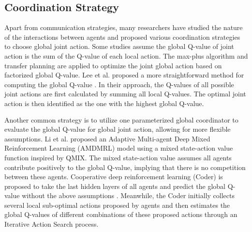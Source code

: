 \subsection{Coordination Strategy}
Apart from communication strategies, many researchers have studied the nature of the interactions between agents and proposed various coordination strategies to choose global joint action. Some studies assume the global Q-value of joint action is the sum of the Q-value of each local action.
The max-plus algorithm and transfer planning are applied to optimize the joint global action based on factorized global Q-value\cite{van2016coordinated}.
Lee et al. proposed a more straightforward method for computing the global Q-value \cite{lee2019reinforcement}. In their approach, the Q-values of all possible joint actions are first calculated by summing all local Q-values. The optimal joint action is then identified as the one with the highest global Q-value.

Another common strategy is to utilize one parameterized global coordinator to evaluate the global Q-value for global joint action, allowing for more flexible assumptions.
Li et al. proposed an Adaptive Multi-agent Deep Mixed Reinforcement Learning (AMDMRL) model using a mixed state-action value function inspired by QMIX\cite{rashid2020monotonic}\cite{li2023adaptive}. The mixed state-action value assumes all agents contribute positively to the global Q-value, implying that there is no competition between these agents.
Cooperative deep reinforcement learning (Coder) is proposed to take the last hidden layers of all agents and predict the global Q-value without the above assumptions \cite{tan2019cooperative}. Meanwhile, the Coder initially collects several local sub-optimal actions proposed by agents and then estimates the global Q-values of different combinations of these proposed actions through an Iterative Action Search process.